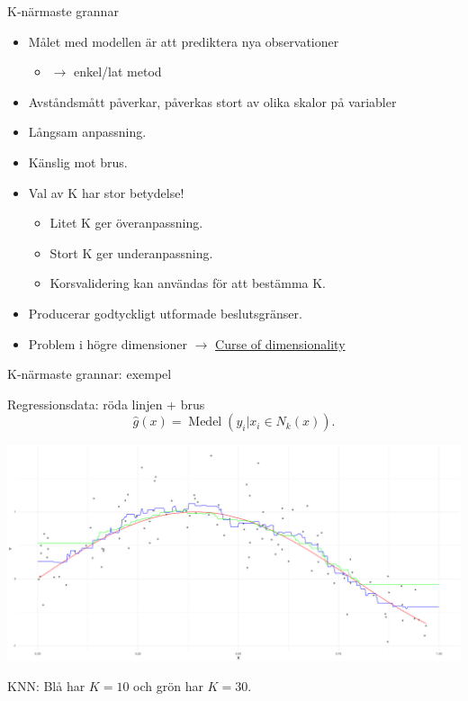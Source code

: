 \documentclass[10pt,english]{beamer}
\begin{document}
\begin{frame}{K-närmaste grannar}

    \begin{itemize}
        \item Målet med modellen är att prediktera nya observationer 
        \begin{itemize}
          \item $\rightarrow$ enkel/lat metod
        \end{itemize}
        \item Avståndsmått påverkar, påverkas stort av olika skalor på variabler
        \item Långsam anpassning.
        \item Känslig mot brus.
        \item Val av K har stor betydelse!
        \begin{itemize}
            \item Litet K ger överanpassning.
            \item Stort K ger underanpassning.
            \item Korsvalidering kan användas för att bestämma K.
        \end{itemize}
        \item Producerar godtyckligt utformade beslutsgränser.
        \item Problem i högre dimensioner $\rightarrow$ \href{https://en.wikipedia.org/wiki/Curse_of_dimensionality}{ Curse of dimensionality}
       
    \end{itemize}
    
\end{frame}


\begin{frame}{K-närmaste grannar: exempel}

    Regressionsdata: röda linjen + brus
    \begin{equation*}
        \hat{g}(x) = \operatorname{Medel}(y_i | x_i \in N_k(x)).
    \end{equation*}

    \includegraphics[width=\textwidth]{fig/knnreg.png}

    KNN: Blå har $K=10$ och grön har $K=30$.
\end{frame}
\end{document}
